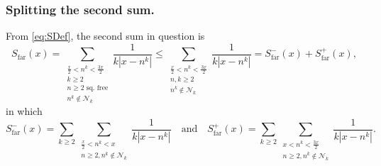 \documentclass[10pt,reqno]{amsart}
\theoremstyle{plain}
\theoremstyle{definition}
\newcommand{\NN}{\mathcal{N}}
\begin{document}
\subsubsection{Splitting the second sum.} 

From \eqref{eq:SDef}, the second sum in question is
\begin{equation*}
    S_{\text{far}}(x)
    = \!\!\!\! \sum_{ \substack{ \frac{x}{2} < n^k < \frac{3x}{2} \\ k \geq 2 \\ \text{$n \geq 2$ sq.~free} \\ n^k \notin \NN_k}}  \frac{1}{ k | x-n^k |}
    \leq \!\!\!\! \sum_{ \substack{ \frac{x}{2} < n^k < \frac{3x}{2} \\ n,k \geq 2 \\ n^k \notin \NN_k}}  \frac{1}{ k | x-n^k |}
    = S_{\text{far}}^-(x)  + S_{\text{far}}^+(x),
\end{equation*}
in which
\begin{equation}\label{eq:FarSide}
    S_{\text{far}}^-(x)
    =  \sum_{k\geq 2} \sum_{ \substack{ \frac{x}{2} < n^k < x  \\ n \geq 2, n^k \notin \NN_k}}  \frac{1}{ k | x-n^k |}
    \quad \text{and} \quad
    S_{\text{far}}^+(x)
    =  \sum_{k\geq 2}  \sum_{ \substack{ x < n^k < \frac{3x}{2} \\ n \geq 2, n^k \notin \NN_k}}   \frac{1}{ k | x-n^k |}.
\end{equation}
\end{document}
